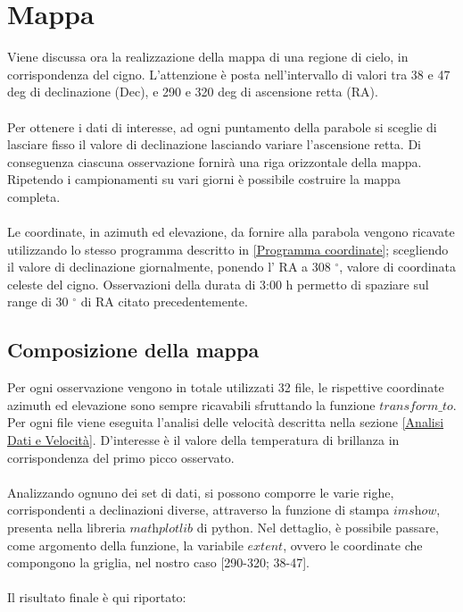 \section{Mappa}

Viene discussa ora la realizzazione della mappa di una regione di cielo, in corrispondenza del cigno. L'attenzione è posta nell'intervallo di valori tra 38 e 47 deg di declinazione (Dec), e 290 e 320 deg di ascensione retta (RA).
\\\\
Per ottenere i dati di interesse, ad ogni puntamento della parabole si sceglie di lasciare fisso il valore di declinazione lasciando variare l'ascensione retta. Di conseguenza ciascuna osservazione fornirà una riga orizzontale della mappa. Ripetendo i campionamenti su vari giorni è possibile costruire la mappa completa. 
\\\\
Le coordinate, in azimuth ed elevazione, da fornire alla parabola vengono ricavate utilizzando lo stesso programma descritto in \ref{Programma coordinate}; scegliendo il valore di declinazione giornalmente, ponendo l' RA a 308 $^{\circ}$, valore di coordinata celeste del cigno. Osservazioni della durata di 3:00 h permetto di spaziare sul range di 30 $^{\circ}$ di RA citato precedentemente.



\subsection{Composizione della mappa}

Per ogni osservazione vengono in totale utilizzati 32 file, le rispettive coordinate azimuth ed elevazione sono sempre ricavabili sfruttando la funzione $transform\_to$. Per ogni file viene eseguita l'analisi delle velocità descritta nella sezione \ref{Analisi Dati e Velocità}. D'interesse è il valore della temperatura di brillanza in corrispondenza del primo picco osservato. 
\\\\
Analizzando ognuno dei set di dati, si possono comporre le varie righe, corrispondenti a declinazioni diverse, attraverso la funzione di stampa $\textit{imshow}$, presenta nella libreria $\textit{mathplotlib}$ di python. Nel dettaglio, è possibile passare, come argomento della funzione, la variabile $\textit{extent}$, ovvero le coordinate che compongono la griglia, nel nostro caso [290-320; 38-47].
\\\\
Il risultato finale è qui riportato: 

